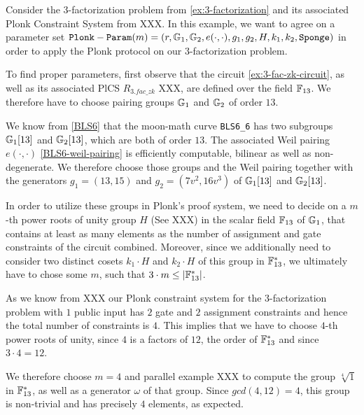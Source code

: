 \begin{example}
\label{ex:3-fac-plonk-params} Consider the $3$-factorization problem from \ref{ex:3-factorization} and its associated Plonk Constraint System from XXX. In this example, we want to agree on a parameter set $\mathtt{Plonk-Param}(m)=(r, \mathbb{G}_1, \mathbb{G}_2, e(\cdot,\cdot), g_1,g_2, H, k_1,k_2, \mathtt{Sponge})$ in order to apply the Plonk protocol on our $3$-factorization problem. 

To find proper parameters, first observe that the circuit \ref{ex:3-fac-zk-circuit}, as well as its associated PlCS $R_{3.fac\_zk}$ XXX, are defined over the field $\mathbb{F}_{13}$. We therefore have to choose pairing groups $\mathbb{G}_1$ and $\mathbb{G}_2$ of order $13$. 

We know from \ref{BLS6} that the moon-math curve \texttt{BLS6\_6} has two subgroups $\mathbb{G}_1[13]$ and $\mathbb{G}_2[13]$, which are both of order $13$. The associated Weil pairing $e(\cdot,\cdot)$ \ref{BLS6-weil-pairing} is efficiently computable, bilinear as well as non-degenerate. We therefore choose those groups and the Weil pairing together with the generators $g_1 = (13,15) $ and $g_2=(7v^2,16v^3)$ of $\mathbb{G}_1[13]$ and $\mathbb{G}_2[13]$. 

In order to utilize these groups in Plonk's proof system, we need to decide on a $m$-th power roots of unity group $H$ (See XXX) in the scalar field $\mathbb{F}_{13}$ of $\mathbb{G}_1$, that contains at least as many elements as the number of assignment and gate constraints of the circuit combined. Moreover, since we additionally need to consider two distinct cosets $k_1\cdot H$ and $k_2\cdot H$ of this group in $\mathbb{F}_{13}^*$, we ultimately have to chose some $m$, such that $3\cdot m \leq |\mathbb{F}_{13}^*|$. 

As we know from XXX our Plonk constraint system for the 3-factorization problem with $1$ public input has $2$ gate and $2$ assignment constraints and hence the total number of constraints is $4$. This implies that we have to choose $4$-th power roots of unity, since $4$ is a factors of $12$, the order of $\mathbb{F}_{13}^*$ and since $3\cdot 4 = 12$.  

We therefore choose $m=4$ and parallel example XXX to compute the group $\sqrt[4]{1}$ in $\mathbb{F}_{13}^*$, as well as a generator $\omega$ of that group. Since $gcd(4,12)=4$, this group is non-trivial and has precisely $4$ elements, as expected. 


\end{example}
